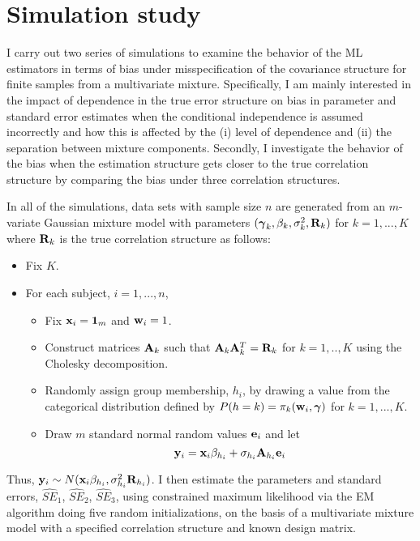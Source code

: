  \section{Simulation study}\label{chp2:sec:sim}
I carry out two series of simulations to examine the behavior of the ML estimators in terms of bias under misspecification of the covariance structure for finite samples from a multivariate mixture. Specifically, I am mainly interested in the impact of dependence in the true error structure on bias in parameter and standard error estimates when the conditional independence is assumed incorrectly and how this is affected by the (i) level of dependence and (ii) the separation between mixture components. Secondly, I investigate the behavior of the bias when the estimation structure gets closer to the true correlation structure by comparing the bias under three correlation structures.

In all of the simulations, data sets with sample size $n$ are generated from an $m$-variate Gaussian mixture model with parameters $(\boldsymbol\gamma_{k},\beta_{k},\sigma^{2}_{k},\mathbf R_k)$ for $k=1,...,K$ where $\mathbf R_k$ is the true correlation structure as follows:
\begin{itemize}
\item Fix $K$. 
\item For each subject, $i=1,...,n$, 
\begin{itemize}
\item Fix $\mathbf x_{i} = \mathbf 1_{m}$ and $\mathbf w_{i}=1$.
\item Construct matrices $\mathbf A_k$ such that $\mathbf A_k\mathbf A_k^{T}=\mathbf R_k$ for $k=1,..,K$ using the Cholesky decomposition. 
\item Randomly assign group membership, $h_{i}$, by drawing a value from the categorical distribution defined by $P(h=k)=\pi_{k}(\mathbf w_{i},\boldsymbol\gamma)$ for $k=1,...,K$. 
\item Draw $m$ standard normal random values $\mathbf e_{i}$ and let
$$\mathbf y_{i}=\mathbf x_{i}\beta_{h_{i}}+\sigma_{h_{i}}\mathbf A_{h_{i}}\mathbf e_{i}$$
\end{itemize}
\end{itemize}
Thus, $\mathbf y_{i}\sim N(\mathbf x_{i}\beta_{h_{i}},\sigma_{h_{i}}^{2}\mathbf R_{h_{i}})$. I then estimate the parameters and standard errors, $\widehat{SE}_1$, $\widehat{SE}_2$, $\widehat{SE}_3$, using constrained maximum likelihood via the EM algorithm \cite{hathaway1985} doing five random initializations, on the basis of a multivariate mixture model with a specified correlation structure and known design matrix.

